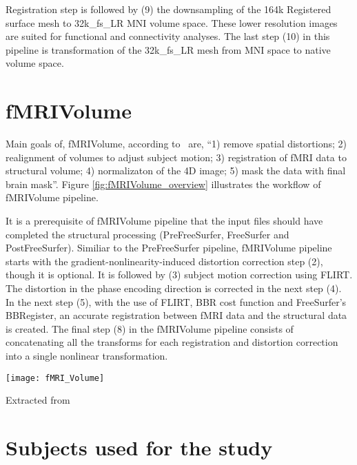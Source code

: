 Registration step is followed by (9) the downsampling of the 164k Registered surface mesh to 32k\_fs\_LR MNI volume space. These lower resolution images are suited for functional and connectivity analyses. The last step (10) in this pipeline is transformation of the 32k\_fs\_LR mesh from MNI space to native volume space.



\section{fMRIVolume} \label{sec:fMRIVolume}
Main goals of, fMRIVolume, according to~\cite{Gla13} are, ``1) remove spatial distortions; 2) realignment of volumes to adjust subject motion; 3) registration of fMRI data to structural volume; 4) normalizaton of the 4D image; 5) mask the data with final brain mask''. Figure \ref{fig:fMRIVolume_overview} illustrates the workflow of fMRIVolume pipeline.

It is a prerequisite of fMRIVolume pipeline that the input files should have completed the structural processing (PreFreeSurfer, FreeSurfer and PostFreeSurfer). Similiar to the PreFreeSurfer pipeline, fMRIVolume pipeline starts with the gradient-nonlinearity-induced distortion correction step (2), though it is optional. It is followed by (3) subject motion correction using FLIRT. The distortion in the phase encoding direction is corrected in the next step (4). In the next step (5), with the use of FLIRT, BBR cost function and FreeSurfer's BBRegister, an accurate registration between fMRI data and the structural data is created. The final step (8) in the fMRIVolume pipeline consists of concatenating all the transforms for each registration and distortion correction into a single nonlinear transformation.

\begin{center}
  \texttt{[image: fMRI\_Volume]}
  \label{fig:fMRIVolume_overview}
  \caption*{Extracted from \cite{Gla13}}
\end{center}

\section{Subjects used for the study}\label{subjects_used}
